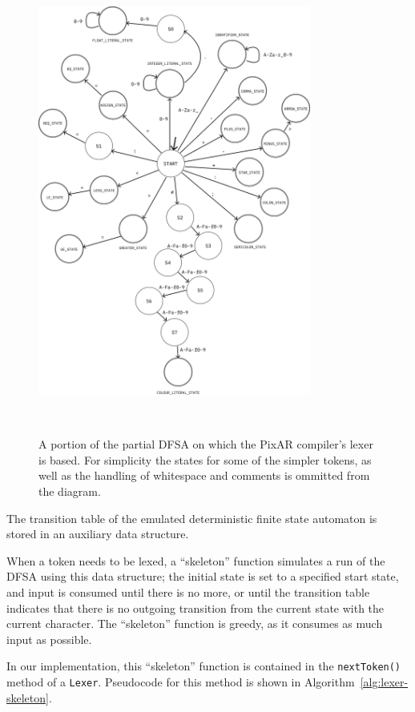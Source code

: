 \documentclass[11pt,a4paper]{scrartcl}
\begin{document}
\begin{figure}
  \centering
  \includegraphics[width=0.8\textwidth]{lexer_dfsa}
  \caption{A portion of the partial DFSA on which the PixAR compiler's lexer is based. For simplicity the states for some of the simpler tokens, as well as the handling of whitespace and comments is ommitted from the diagram.}~\label{fig:lexer-dfsa}
\end{figure}

The transition table of the emulated deterministic finite state automaton is stored in an auxiliary data structure.

When a token needs to be lexed, a ``skeleton'' function simulates a run of the DFSA using this data structure; the initial state is set to a specified start state, and input is consumed until there is no more, or until the transition table indicates that there is no outgoing transition from the current state with the current character. The ``skeleton'' function is greedy, as it consumes as much input as possible.

In our implementation, this ``skeleton'' function is contained in the \verb|nextToken()| method of a \verb|Lexer|. Pseudocode for this method is shown in Algorithm~\ref{alg:lexer-skeleton}.
\end{document}
